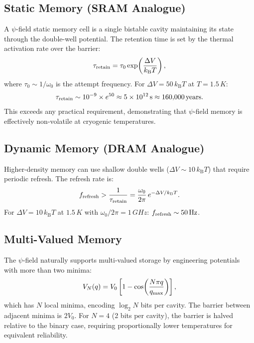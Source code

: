 \documentclass[12pt,a4paper,twoside]{article}
\newcommand{\kB}{k_{\mathrm{B}}}
\begin{document}
\subsection{Static Memory (SRAM Analogue)}\label{sec:sram}

A $\psi$-field static memory cell is a single bistable cavity maintaining its state through the double-well potential. The retention time is set by the thermal activation rate over the barrier:
\begin{equation}
\tau_{\rm retain} = \tau_0 \exp\!\left(\frac{\Delta V}{\kB T}\right),
\label{eq:retention}
\end{equation}
where $\tau_0 \sim 1/\omega_0$ is the attempt frequency. For $\Delta V = 50\,\kB T$ at $T = 1.5\,\si{K}$:
\begin{equation}
\tau_{\rm retain} \sim 10^{-9} \times e^{50} \approx 5 \times 10^{12}\,\si{s} \approx 160{,}000\,\text{years}.
\end{equation}
This exceeds any practical requirement, demonstrating that $\psi$-field memory is effectively non-volatile at cryogenic temperatures.

\subsection{Dynamic Memory (DRAM Analogue)}\label{sec:dram}

Higher-density memory can use shallow double wells ($\Delta V \sim 10\,\kB T$) that require periodic refresh. The refresh rate is:
\begin{equation}
f_{\rm refresh} > \frac{1}{\tau_{\rm retain}} = \frac{\omega_0}{2\pi}\,e^{-\Delta V/\kB T}.
\end{equation}
For $\Delta V = 10\,\kB T$ at $1.5\,\si{K}$ with $\omega_0/2\pi = 1\,\si{GHz}$: $f_{\rm refresh} \sim 50\,\si{Hz}$.

\subsection{Multi-Valued Memory}\label{sec:multi_memory}

The $\psi$-field naturally supports multi-valued storage by engineering potentials with more than two minima:
\begin{equation}
V_N(q) = V_0\left[1 - \cos\!\left(\frac{N\pi q}{q_{\rm max}}\right)\right],
\end{equation}
which has $N$ local minima, encoding $\log_2 N$ bits per cavity. The barrier between adjacent minima is $2V_0$. For $N = 4$ (2 bits per cavity), the barrier is halved relative to the binary case, requiring proportionally lower temperatures for equivalent reliability.
\end{document}

